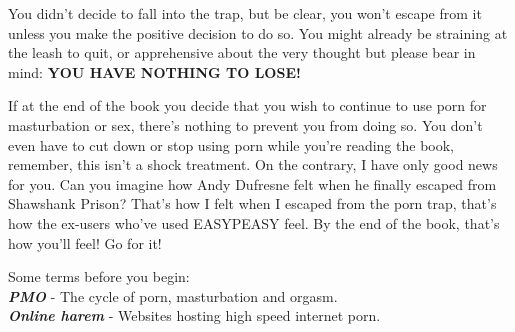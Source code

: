 \documentclass[easypeasy.tex]{subfiles}
\begin{document}
You didn't decide to fall into the trap, but be clear, you won't escape from it unless you make the positive decision to do so. You might already be straining at the leash to quit, or apprehensive about the very thought but please bear in mind: 
\textbf{YOU HAVE NOTHING TO LOSE!}

If at the end of the book you decide that you wish to continue to use porn for masturbation or sex, there's nothing to prevent you from doing so. You don't even have to cut down or stop using porn while you're reading the book, remember, this isn't a shock treatment. On the contrary, I have only good news for you. Can you imagine how Andy Dufresne felt when he finally escaped from Shawshank Prison? That's how I felt when I escaped from the porn trap, that's how the ex-users who've used EASYPEASY feel. By the end of the book, that's how you'll feel! Go for it!

Some terms before you begin:\\
{\small \textbf{\textit{PMO}} - The cycle of porn, masturbation and orgasm.\\
  \textbf{\textit{Online harem}} - Websites hosting high speed internet porn.
  }
\end{document}

